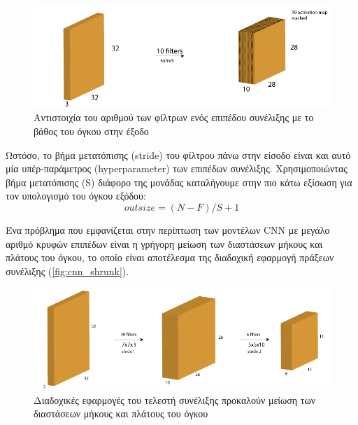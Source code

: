 \begin{figure}[!ht]
  \centering
  \includegraphics[width=1\textwidth]{./images/chapter3/cnn_num_filters.png}
  \caption[Αντιστοιχία του αριθμού των φίλτρων ενός επιπέδου συνέλιξης με το βάθος του όγκου στην έξοδο]{Αντιστοιχία του αριθμού των φίλτρων ενός επιπέδου συνέλιξης με το βάθος του όγκου στην έξοδο}
  \label{fig:cnn_num_filters}
\end{figure}

Ωστόσο, το βήμα μετατόπισης (stride) του φίλτρου πάνω στην είσοδο είναι και αυτό
μία υπέρ-παράμετρος (hyperparameter) των επιπέδων συνέλιξης.
Χρησιμοποιώντας βήμα μετατόπισης (S) διάφορο της μονάδας καταλήγουμε στην πιο κάτω
εξίσωση για τον υπολογισμό του όγκου εξόδου:
\begin{equation*}
  outsize = (N-F)/S + 1
\end{equation*}

Ένα πρόβλημα που εμφανίζεται στην περίπτωση των μοντέλων CNN με μεγάλο αριθμό
κρυφών επιπέδων είναι η γρήγορη μείωση των διαστάσεων μήκους και πλάτους του
όγκου, το οποίο είναι αποτέλεσμα της διαδοχική εφαρμογή πράξεων συνέλιξης (\autoref{fig:cnn_shrunk}).

\begin{figure}[!ht]
  \centering
  \includegraphics[width=1\textwidth]{./images/chapter3/cnn_shrunk.png}
  \caption[Διαδοχικές εφαρμογές του τελεστή συνέλιξης προκαλούν μείωση των διαστάσεων μήκους και πλάτους του όγκου]{Διαδοχικές εφαρμογές του τελεστή συνέλιξης προκαλούν μείωση των διαστάσεων μήκους και πλάτους του όγκου}
  \label{fig:cnn_shrunk}
\end{figure}

